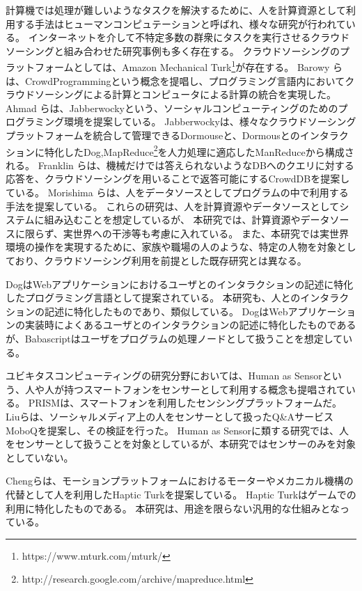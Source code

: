 \documentclass[twoside]{wiss}
\begin{document}
計算機では処理が難しいようなタスクを解決するために、人を計算資源として利用する手法はヒューマンコンピュテーション\cite{humancomputation}と呼ばれ、様々な研究が行われている。
インターネットを介して不特定多数の群衆にタスクを実行させるクラウドソーシングと組み合わせた研究事例も多く存在する。
クラウドソーシングのプラットフォームとしては、Amazon Mechanical Turk\footnote{https://www.mturk.com/mturk/}が存在する。
Barowy らは、CrowdProgrammingという概念を提唱し、プログラミング言語内においてクラウドソーシングによる計算とコンピュータによる計算の統合を実現した\cite{automan}。
Ahmad らは、Jabberwocky\cite{jabberwocky}という、ソーシャルコンピューティングのためのプログラミング環境を提案している。
Jabberwockyは、様々なクラウドソーシングプラットフォームを統合して管理できるDormouseと、Dormousとのインタラクションに特化したDog,MapReduce\footnote{http://research.google.com/archive/mapreduce.html}を人力処理に適応したManReduceから構成される。
Franklin らは、機械だけでは答えられないようなDBへのクエリに対する応答を、クラウドソーシングを用いることで返答可能にするCrowdDBを提案している\cite{crowddb}。
Morishima らは、人をデータソースとしてプログラムの中で利用する手法を提案している\cite{cylog}。
これらの研究は、人を計算資源やデータソースとしてシステムに組み込むことを想定しているが、
本研究では、計算資源やデータソースに限らず、実世界への干渉等も考慮に入れている。
また、本研究では実世界環境の操作を実現するために、家族や職場の人のような、特定の人物を対象としており、クラウドソーシング利用を前提とした既存研究とは異なる。

Dog\cite{dog}はWebアプリケーションにおけるユーザとのインタラクションの記述に特化したプログラミング言語として提案されている。
本研究も、人とのインタラクションの記述に特化したものであり、類似している。
DogはWebアプリケーションの実装時によくあるユーザとのインタラクションの記述に特化したものであるが、Babascriptはユーザをプログラムの処理ノードとして扱うことを想定している。

ユビキタスコンピューティングの研究分野においては、Human as Sensorという、人や人が持つスマートフォンをセンサーとして利用する概念も提唱されている。
PRISMは、スマートフォンを利用したセンシングプラットフォームだ\cite{prism}。
Liuらは、ソーシャルメディア上の人をセンサーとして扱ったQ\&AサービスMoboQを提案し、その検証を行った。
Human as Sensorに類する研究では、人をセンサーとして扱うことを対象としているが、本研究ではセンサーのみを対象としていない。

Chengらは、モーションプラットフォームにおけるモーターやメカニカル機構の代替として人を利用したHaptic Turkを提案している\cite{hapticturk}。
Haptic Turkはゲームでの利用に特化したものである。
本研究は、用途を限らない汎用的な仕組みとなっている。
\end{document}
